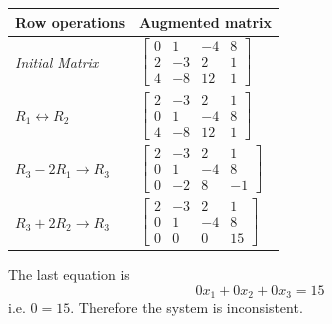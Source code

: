 \documentclass[../linear-algebra.tex]{subfiles}
\begin{document}
\begin{table}[H]
\centering
\renewcommand{\arraystretch}{1.2}

\begin{tabular}{|>{\centering\arraybackslash}m{4.5cm}|>{\centering\arraybackslash}m{6.5cm}|}
    \hline
    \textbf{Row operations} & \textbf{Augmented matrix} \\ \hline
    
    \rule{0pt}{2.5em} 
    \textit{Initial Matrix}
    & 
    $\left[
    \begin{array}{ccc|c}
        0 &  1 & -4 & 8 \\
        2 & -3 &  2 & 1 \\
        4 & -8 & 12 & 1
    \end{array}
    \right]$ 
    \\[2em] \hline
    
    \rule{0pt}{2.5em} 
    $R_1 \leftrightarrow R_2$ 
    & 
    $\left[
    \begin{array}{ccc|c}
        2 & -3 &  2 & 1 \\
        0 &  1 & -4 & 8 \\
        4 & -8 & 12 & 1
    \end{array}
    \right]$ 
    \\[2em] \hline
    
    \rule{0pt}{2.5em} 
    $R_3 - 2R_1 \rightarrow R_3$ 
    & 
    $\left[
    \begin{array}{ccc|c}
        2 & -3 &  2 &  1 \\
        0 &  1 & -4 &  8 \\
        0 & -2 &  8 & -1
    \end{array}
    \right]$ 
    \\[2em] \hline
    
    \rule{0pt}{2.5em} 
    $R_3 + 2R_2 \rightarrow R_3$ 
    & 
    $\left[
    \begin{array}{ccc|c}
        2 & -3 &  2 &  1 \\
        0 &  1 & -4 &  8 \\
        0 &  0 &  0 & 15
    \end{array}
    \right]$ 
    \\[2em] \hline
\end{tabular}
\end{table}
\noindent The last equation is
\[0x_1 + 0x_2 + 0x_3 = 15\]
i.e. $0=15$. Therefore the system is inconsistent.
\end{document}
